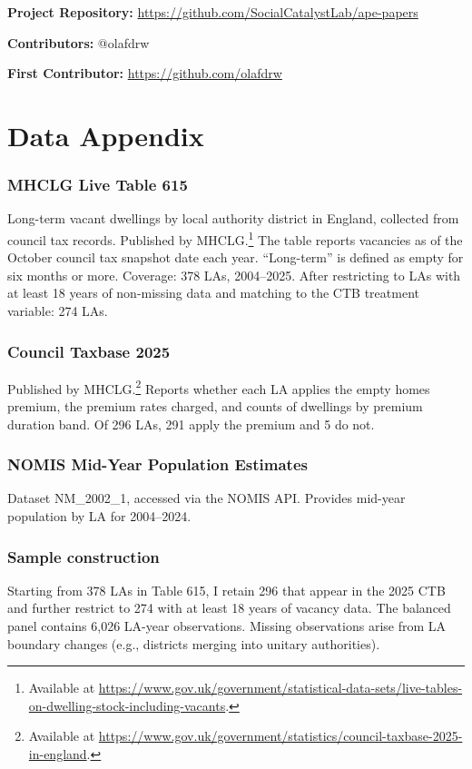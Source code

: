 \documentclass[12pt]{article}
\begin{document}
\noindent\textbf{Project Repository:} \url{https://github.com/SocialCatalystLab/ape-papers}

\noindent\textbf{Contributors:} @olafdrw

\noindent\textbf{First Contributor:} \url{https://github.com/olafdrw}

\label{apep_main_text_end}
\newpage


\newpage
\appendix

\section{Data Appendix}

\subsubsection*{MHCLG Live Table 615} Long-term vacant dwellings by local authority district in England, collected from council tax records. Published by MHCLG.\footnote{Available at \url{https://www.gov.uk/government/statistical-data-sets/live-tables-on-dwelling-stock-including-vacants}.} The table reports vacancies as of the October council tax snapshot date each year. ``Long-term'' is defined as empty for six months or more. Coverage: 378 LAs, 2004--2025. After restricting to LAs with at least 18 years of non-missing data and matching to the CTB treatment variable: 274 LAs.

\subsubsection*{Council Taxbase 2025} Published by MHCLG.\footnote{Available at \url{https://www.gov.uk/government/statistics/council-taxbase-2025-in-england}.} Reports whether each LA applies the empty homes premium, the premium rates charged, and counts of dwellings by premium duration band. Of 296 LAs, 291 apply the premium and 5 do not.

\subsubsection*{NOMIS Mid-Year Population Estimates} Dataset NM\_2002\_1, accessed via the NOMIS API. Provides mid-year population by LA for 2004--2024.

\subsubsection*{Sample construction} Starting from 378 LAs in Table 615, I retain 296 that appear in the 2025 CTB and further restrict to 274 with at least 18 years of vacancy data. The balanced panel contains 6,026 LA-year observations. Missing observations arise from LA boundary changes (e.g., districts merging into unitary authorities).
\end{document}
